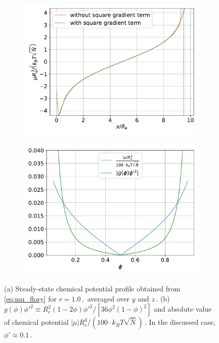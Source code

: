 \documentclass[bachelor,       %
               oneside,        %
               BCOR10mm,       %
               ngerman, english %
               ]{GAUBM}
\begin{document}
\begin{figure}[h]
  \centering
  \begin{subfigure}[b]{0.45\textwidth}
      \centering
      \includegraphics[width=\textwidth]{figures/mu_coll_diff.pdf}
      \caption{}
      \label{fig:chemical_potential}
  \end{subfigure}
    \hfill
  \begin{subfigure}[b]{0.45\textwidth}
      \centering
      \includegraphics[width=\textwidth]{figures/squaregradient_contribution.pdf}
      \caption{}
      \label{fig:gradmu_fft}
  \end{subfigure}
     \caption{(a) Steady-state chemical potential profile obtained from \autoref{eq:mu_flory} for $r=1.0\,,$ averaged over $y$ and $z\,.$ (b) $g(\phi)\phi'^2\equiv R_e^2(1-2\phi)\phi'^2/[36\phi^2(1-\phi)^2]$ and absolute value of chemical potential $|\mu|R_e^3/(100\cdot k_BT\sqrt{\bar{N}})\,.$ In the discussed case, $\phi'\approx 0.1\,.$ }
     \label{fig:squaregradient_contribution}
\end{figure}
\end{document}
